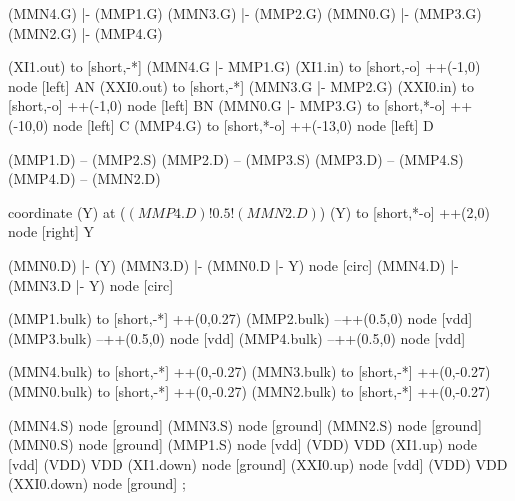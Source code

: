 \begin{circuitikz}[american]

	(MMN4.G) |- (MMP1.G)
	(MMN3.G) |- (MMP2.G)
	(MMN0.G) |- (MMP3.G)
	(MMN2.G) |- (MMP4.G)
	
	(XI1.out) to [short,-*] (MMN4.G |- MMP1.G)
	(XI1.in) to [short,-o] ++(-1,0) node [left] {AN}
	(XXI0.out) to [short,-*] (MMN3.G |- MMP2.G)
	(XXI0.in) to [short,-o] ++(-1,0) node [left] {BN}
	(MMN0.G |- MMP3.G) to [short,*-o] ++(-10,0) node [left] {C}
	(MMP4.G) to [short,*-o] ++(-13,0) node [left] {D}	
	
	(MMP1.D) -- (MMP2.S)
	(MMP2.D) -- (MMP3.S)	
	(MMP3.D) -- (MMP4.S)
	(MMP4.D) -- (MMN2.D)
	
	coordinate (Y) at ($(MMP4.D)!0.5!(MMN2.D)$)
	(Y) to [short,*-o] ++(2,0) node [right] {Y}
	
	(MMN0.D) |- (Y)
	(MMN3.D) |- (MMN0.D |- Y) node [circ] {}
	(MMN4.D) |- (MMN3.D |- Y) node [circ] {}
	
	(MMP1.bulk) to [short,-*] ++(0,0.27)
	(MMP2.bulk) --++(0.5,0) node [vdd] {}
	(MMP3.bulk) --++(0.5,0) node [vdd] {}
	(MMP4.bulk) --++(0.5,0) node [vdd] {}
	
	(MMN4.bulk) to [short,-*] ++(0,-0.27)
	(MMN3.bulk) to [short,-*] ++(0,-0.27)
	(MMN0.bulk) to [short,-*] ++(0,-0.27)
	(MMN2.bulk) to [short,-*] ++(0,-0.27)


	(MMN4.S) node [ground] {}
	(MMN3.S) node [ground] {}
	(MMN2.S) node [ground] {}
	(MMN0.S) node [ground] {}
	(MMP1.S) node [vdd] (VDD) {VDD}
	(XI1.up) node [vdd] (VDD) {VDD}
	(XI1.down) node [ground] {}
	(XXI0.up) node [vdd] (VDD) {VDD}
	(XXI0.down) node [ground] {}
;

\end{circuitikz}
